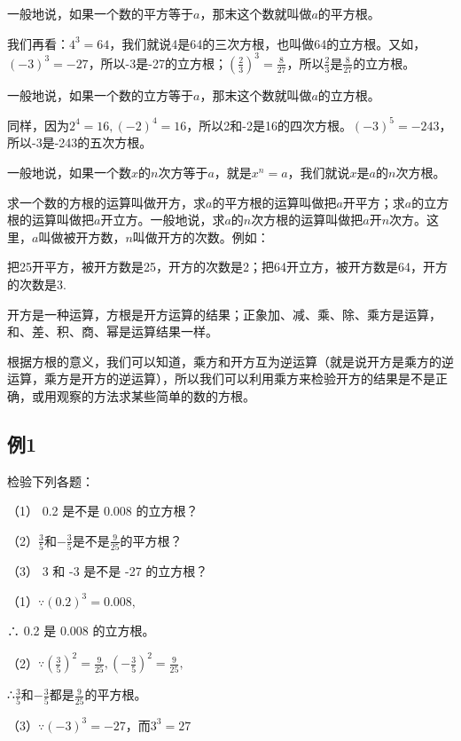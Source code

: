 一般地说，如果一个数的平方等于\(a\)，那末这个数就叫做\(a\)的平方根。

我们再看：\(4^{3}=64\)，我们就说4是64的三次方根，也叫做64的立方根。又如，\((-3)^{3}=-27\)，所以-3是-27的立方根；\(\left(\frac{2}{3}\right)^{3}=\frac{8}{27}\)，所以\(\frac{2}{3}\)是\(\frac{8}{27}\)的立方根。

一般地说，如果一个数的立方等于\(a\)，那末这个数就叫做\(a\)的立方根。

同样，因为\(2^{4} = 16, (-2)^{4} = 16\)，所以2和-2是16的四次方根。\((-3)^{5} = -243\)，所以-3是-243的五次方根。

一般地说，如果一个数\(x\)的\(n\)次方等于\(a\)，就是\(x^n = a\)，我们就说\(x\)是\(a\)的\(n\)次方根。

求一个数的方根的运算叫做开方，求\(a\)的平方根的运算叫做把\(a\)开平方；求\(a\)的立方根的运算叫做把\(a\)开立方。一般地说，求\(a\)的\(n\)次方根的运算叫做把\(a\)开\(n\)次方。这里，\(a\)叫做被开方数，\(n\)叫做开方的次数。例如：

把25开平方，被开方数是25，开方的次数是2；把64开立方，被开方数是64，开方的次数是3.


开方是一种运算，方根是开方运算的结果；正象加、减、乘、除、乘方是运算，和、差、积、商、幂是运算结果一样。

根据方根的意义，我们可以知道，乘方和开方互为逆运算（就是说开方是乘方的逆运算，乘方是开方的逆运算），所以我们可以利用乘方来检验开方的结果是不是正确，或用观察的方法求某些简单的数的方根。

\subsection{例1}

检验下列各题：

（1） 0.2 是不是 0.008 的立方根？

（2）\(\frac{3}{5}\)和\(-\frac{3}{5}\)是不是\(\frac{9}{25}\)的平方根？

（3） 3 和 -3 是不是 -27 的立方根？

 （1）\(\because (0.2)^{3} = 0.008,\)

∴ 0.2 是 0.008 的立方根。

（2）\(\because \left(\frac{3}{5}\right)^2 = \frac{9}{25}, \left(-\frac{3}{5}\right)^2 = \frac{9}{25},\)

∴\(\frac{3}{5}\)和\(-\frac{3}{5}\)都是\(\frac{9}{25}\)的平方根。

（3）\(\because (-3)^{3} = -27\)，而\(3^{3} = 27\)

